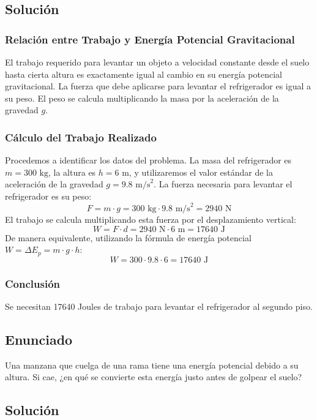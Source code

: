 \documentclass[12pt,a4paper]{article}
\begin{document}
\subsection*{Solución}

\subsubsection*{Relación entre Trabajo y Energía Potencial Gravitacional}
El trabajo requerido para levantar un objeto a velocidad constante desde el suelo hasta cierta altura es exactamente igual al cambio en su energía potencial gravitacional. La fuerza que debe aplicarse para levantar el refrigerador es igual a su peso. El peso se calcula multiplicando la masa por la aceleración de la gravedad $g$.

\subsubsection*{Cálculo del Trabajo Realizado}
Procedemos a identificar los datos del problema. La masa del refrigerador es $m = 300 \text{ kg}$, la altura es $h = 6 \text{ m}$, y utilizaremos el valor estándar de la aceleración de la gravedad $g = 9.8 \text{ m/s}^2$.
La fuerza necesaria para levantar el refrigerador es su peso:
$$F = m \cdot g = 300 \text{ kg} \cdot 9.8 \text{ m/s}^2 = 2940 \text{ N}$$
El trabajo se calcula multiplicando esta fuerza por el desplazamiento vertical:
$$W = F \cdot d = 2940 \text{ N} \cdot 6 \text{ m} = 17640 \text{ J}$$
De manera equivalente, utilizando la fórmula de energía potencial $W = \Delta E_p = m \cdot g \cdot h$:
$$W = 300 \cdot 9.8 \cdot 6 = 17640 \text{ J}$$

\subsubsection*{Conclusión}
Se necesitan 17640 Joules de trabajo para levantar el refrigerador al segundo piso.

\newpage
\subsection*{Enunciado}
Una manzana que cuelga de una rama tiene una energía potencial debido a su altura. Si cae, ¿en qué se convierte esta energía justo antes de golpear el suelo?

\subsection*{Solución}
\end{document}
